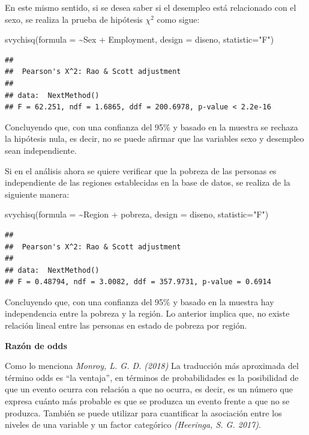 \documentclass[
  12pt,
]{book}
\newenvironment{Shaded}{\begin{snugshade}}{\end{snugshade}}
\newcommand{\AttributeTok}[1]{\textcolor[rgb]{0.77,0.63,0.00}{#1}}
\newcommand{\FunctionTok}[1]{\textcolor[rgb]{0.00,0.00,0.00}{#1}}
\newcommand{\NormalTok}[1]{#1}
\newcommand{\SpecialCharTok}[1]{\textcolor[rgb]{0.00,0.00,0.00}{#1}}
\newcommand{\StringTok}[1]{\textcolor[rgb]{0.31,0.60,0.02}{#1}}
\begin{document}
En este mismo sentido, si se desea saber si el desempleo está relacionado con el sexo, se realiza la prueba de hipótesis \(\chi^{2}\) como sigue:

\begin{Shaded}
\begin{Highlighting}[]
\FunctionTok{svychisq}\NormalTok{(}\AttributeTok{formula =} \SpecialCharTok{\textasciitilde{}}\NormalTok{Sex }\SpecialCharTok{+}\NormalTok{ Employment, }
         \AttributeTok{design =}\NormalTok{ diseno,  }\AttributeTok{statistic=}\StringTok{"F"}\NormalTok{)}
\end{Highlighting}
\end{Shaded}

\begin{verbatim}
## 
##  Pearson's X^2: Rao & Scott adjustment
## 
## data:  NextMethod()
## F = 62.251, ndf = 1.6865, ddf = 200.6978, p-value < 2.2e-16
\end{verbatim}

Concluyendo que, con una confianza del 95\% y basado en la muestra se rechaza la hipótesis nula, es decir, no se puede afirmar que las variables sexo y desempleo sean independiente.

Si en el análisis ahora se quiere verificar que la pobreza de las personas es independiente de las regiones establecidas en la base de datos, se realiza de la siguiente manera:

\begin{Shaded}
\begin{Highlighting}[]
\FunctionTok{svychisq}\NormalTok{(}\AttributeTok{formula =} \SpecialCharTok{\textasciitilde{}}\NormalTok{Region }\SpecialCharTok{+}\NormalTok{ pobreza, }
         \AttributeTok{design =}\NormalTok{ diseno,  }\AttributeTok{statistic=}\StringTok{"F"}\NormalTok{)}
\end{Highlighting}
\end{Shaded}

\begin{verbatim}
## 
##  Pearson's X^2: Rao & Scott adjustment
## 
## data:  NextMethod()
## F = 0.48794, ndf = 3.0082, ddf = 357.9731, p-value = 0.6914
\end{verbatim}

Concluyendo que, con una confianza del 95\% y basado en la muestra hay independencia entre la pobreza y la región. Lo anterior implica que, no existe relación lineal entre las personas en estado de pobreza por región.

\textbf{Razón de odds}

Como lo menciona \emph{Monroy, L. G. D. (2018)} La traducción más aproximada del término odds es ``la ventaja'', en términos de probabilidades es la posibilidad de que un evento ocurra con relación a que no ocurra, es decir, es un número que expresa cuánto más probable es que se produzca un evento frente a que no se produzca. También se puede utilizar para cuantificar la asociación entre los niveles de una variable y un factor categórico \emph{(Heeringa, S. G. 2017)}.
\end{document}
